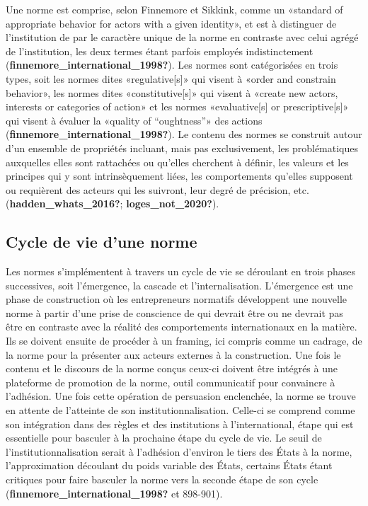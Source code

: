 \documentclass[12pt]{ulaval}
\begin{document}
Une norme est comprise, selon Finnemore et Sikkink, comme un «standard of appropriate behavior for actors with a given identity», et est à distinguer de l'institution de par le caractère unique de la norme en contraste avec celui agrégé de l'institution, les deux termes étant parfois employés indistinctement (\textbf{finnemore\_international\_1998?}). Les normes sont catégorisées en trois types, soit les normes dites «regulative{[}s{]}» qui visent à «order and constrain behavior», les normes dites «constitutive{[}s{]}» qui visent à «create new actors, interests or categories of action» et les normes «evaluative{[}s{]} or prescriptive{[}s{]}» qui visent à évaluer la «quality of ``oughtness''» des actions (\textbf{finnemore\_international\_1998?}). Le contenu des normes se construit autour d'un ensemble de propriétés incluant, mais pas exclusivement, les problématiques auxquelles elles sont rattachées ou qu'elles cherchent à définir, les valeurs et les principes qui y sont intrinsèquement liées, les comportements qu'elles supposent ou requièrent des acteurs qui les suivront, leur degré de précision, etc. (\textbf{hadden\_whats\_2016?}; \textbf{loges\_not\_2020?}).

\subsection{Cycle de vie d'une norme}\label{cycle-de-vie-dune-norme}

Les normes s'implémentent à travers un cycle de vie se déroulant en trois phases successives, soit l'émergence, la cascade et l'internalisation. L'émergence est une phase de construction où les entrepreneurs normatifs développent une nouvelle norme à partir d'une prise de conscience de qui devrait être ou ne devrait pas être en contraste avec la réalité des comportements internationaux en la matière. Ils se doivent ensuite de procéder à un framing, ici compris comme un cadrage, de la norme pour la présenter aux acteurs externes à la construction. Une fois le contenu et le discours de la norme conçus ceux-ci doivent être intégrés à une plateforme de promotion de la norme, outil communicatif pour convaincre à l'adhésion. Une fois cette opération de persuasion enclenchée, la norme se trouve en attente de l'atteinte de son institutionnalisation. Celle-ci se comprend comme son intégration dans des règles et des institutions à l'international, étape qui est essentielle pour basculer à la prochaine étape du cycle de vie. Le seuil de l'institutionnalisation serait à l'adhésion d'environ le tiers des États à la norme, l'approximation découlant du poids variable des États, certains États étant critiques pour faire basculer la norme vers la seconde étape de son cycle (\textbf{finnemore\_international\_1998?} et 898-901).
\end{document}
